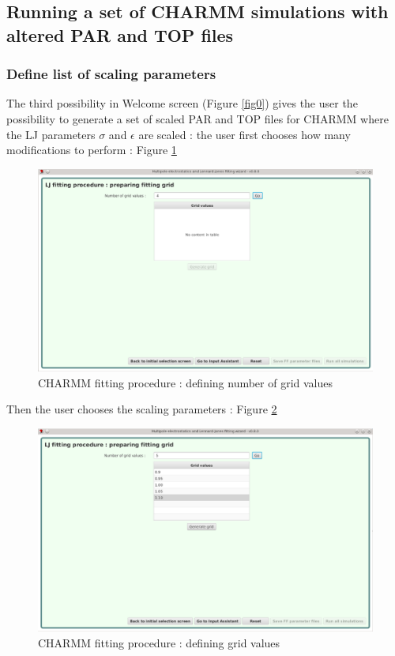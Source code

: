 \documentclass[12pt,a4paper]{article}
\begin{document}
\clearpage

\subsection{Running a set of CHARMM simulations with altered PAR and TOP files}

\subsubsection{Define list of scaling parameters}

The third possibility in Welcome screen (Figure \ref{fig0}) gives the user the possibility to 
generate a set of scaled PAR and TOP files for CHARMM where the LJ parameters $\sigma$ and 
$\epsilon$ are scaled : the user first chooses how many modifications to perform : Figure 
\ref{fig9}\\

\begin{figure}[h!]
\centering
\includegraphics[width=0.9\linewidth]{pics/scr9}
\caption{CHARMM fitting procedure : defining number of grid values}
\label{fig9}
\end{figure}

Then the user chooses the scaling parameters : Figure \ref{fig10}\\

\begin{figure}[h!]
\centering
\includegraphics[width=0.9\linewidth]{pics/scr10}
\caption{CHARMM fitting procedure : defining grid values}
\label{fig10}
\end{figure}
\end{document}
